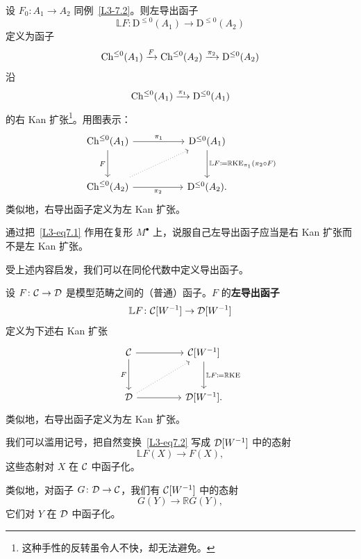 \begin{example}\label{L3-7.7}
设 $F_{0}\colon A_{1}\to A_{2}$ 同例~\ref{L3-7.2}。则左导出函子
\[
\mathbb{L}F\colon\mathrm{D}^{\le 0}(A_{1})\to\mathrm{D}^{\le 0}(A_{2})
\]
定义为函子
\[
\operatorname{Ch}^{\le 0}(A_{1})\xrightarrow{F}\operatorname{Ch}^{\le 0}(A_{2})\xrightarrow{\pi_{2}}\mathrm{D}^{\le 0}(A_{2})
\]
沿
\[
\operatorname{Ch}^{\le 0}(A_{1})\xrightarrow{\pi_{1}}\mathrm{D}^{\le 0}(A_{1})
\]
的右 Kan 扩张\footnote{这种手性的反转虽令人不快，却无法避免。}。用图表示：
\begin{equation}\label{L3-eq7.1}
\begin{tikzcd}[column sep=5.2em,row sep=2.8em]
\Ch^{\le 0}(A_{1})\arrow[r,"\pi_{1}"]\arrow[d,"F"'] & \mathrm{D}^{\le 0}(A_{1})\arrow[d,"{\mathbb{L}F\defeq\mathbb{R}\mathrm{KE}_{\pi_{1}}(\pi_{2}\circ F)}"]\\
\Ch^{\le 0}(A_{2})\arrow[r,"\pi_{2}"']\arrow[ur,dotted] & \mathrm{D}^{\le 0}(A_{2}).
\end{tikzcd}
\end{equation}
类似地，右导出函子定义为左 Kan 扩张。
\end{example}

\begin{exercise}\label{L3-7.8}
通过把~\eqref{L3-eq7.1} 作用在复形 $M^{\bullet}$ 上，说服自己左导出函子应当是右 Kan 扩张而不是左 Kan 扩张。
\end{exercise}

\nitem\label{L3-7.9}
受上述内容启发，我们可以在同伦代数中定义导出函子。

\begin{definition}\label{L3-7.10}
设 $F\colon\mathcal{C}\to\mathcal{D}$ 是模型范畴之间的（普通）函子。$F$ 的\textbf{左导出函子}
\[
\mathbb{L}F\colon\mathcal{C}[W^{-1}]\to\mathcal{D}[W^{-1}]
\]
定义为下述右 Kan 扩张
\begin{equation}\label{L3-eq7.2}
\begin{tikzcd}[column sep=4.6em,row sep=2.8em]
\cC\arrow[r]\arrow[d,"F"'] & \cC[W^{-1}]\arrow[d,"{\mathbb{L}F\defeq\mathbb{R}\mathrm{KE}}"]\\
\cD\arrow[r]\arrow[ur,dotted] & \cD[W^{-1}].
\end{tikzcd}
\end{equation}
类似地，右导出函子定义为左 Kan 扩张。
\end{definition}

\begin{remark}\label{L3-7.11}
我们可以滥用记号，把自然变换~\eqref{L3-eq7.2} 写成 $\mathcal{D}[W^{-1}]$ 中的态射
\[
\mathbb{L}F(X)\to F(X),
\]
这些态射对 $X$ 在 $\mathcal{C}$ 中函子化。

类似地，对函子 $G\colon\mathcal{D}\to\mathcal{C}$，我们有 $\mathcal{C}[W^{-1}]$ 中的态射
\[
G(Y)\to\mathbb{R}G(Y),
\]
它们对 $Y$ 在 $\mathcal{D}$ 中函子化。
\end{remark}

